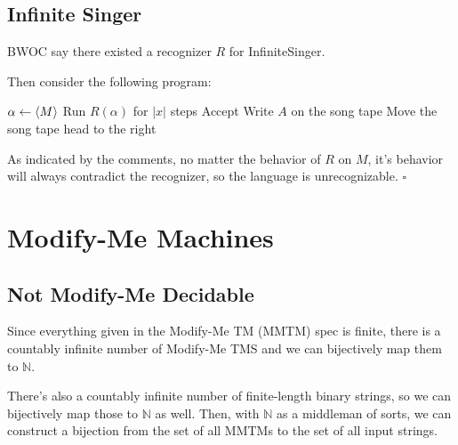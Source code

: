 \documentclass[12pt]{article}
\newcommand{\N}{\mathbb{N}}
\begin{document}
\pagebreak

\subsection{Infinite Singer}

BWOC say there existed a recognizer $R$ for InfiniteSinger.

Then consider the following program:
\begin{algorithmic}[1]
        \State $\alpha \gets \Braket{M}$
        \State Run $R(\alpha)$ for $|x|$ steps
            \State Accept
        \Else
            \For{$n \in \N$}
                \State Write $A$ on the song tape
                \State Move the song tape head to the right
            \EndFor    
        \EndIf
    \EndProcedure
\end{algorithmic}
As indicated by the comments, no matter the behavior of $R$ on $M$,
it's behavior will always contradict the recognizer,
so the language is unrecognizable. $\square$

\pagebreak

\section{Modify-Me Machines}

\subsection{Not Modify-Me Decidable}


Since everything given in the Modify-Me TM (MMTM) spec is finite, there is a countably
infinite number of Modify-Me TMS and we can bijectively map them to $\N$.

There's also a countably infinite number of finite-length binary strings,
so we can bijectively map those to $\N$ as well.
Then, with $\N$ as a middleman of sorts, we can construct a bijection
from the set of all MMTMs to the set of all input strings.
\end{document}

